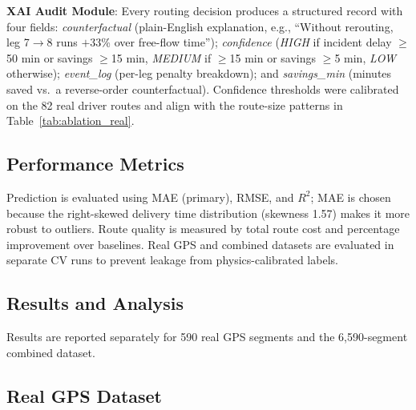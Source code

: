 \documentclass[conference]{IEEEtran}
\newcommand{\mar}[1]{\textcolor{black!90!white}{#1}}
\begin{document}
\textbf{XAI Audit Module}: Every routing decision produces a structured record
with four fields: \textit{counterfactual} (plain-English explanation, e.g.,
``Without rerouting, leg 7$\to$8 runs $+$33\% over free-flow time'');
\textit{confidence} (\textit{HIGH} if incident delay $\geq$50 min or savings
$\geq$15 min, \textit{MEDIUM} if $\geq$15 min or savings $\geq$5 min,
\textit{LOW} otherwise); \textit{event\_log} (per-leg penalty breakdown); and
\textit{savings\_min} (minutes saved vs.\ a reverse-order counterfactual).
Confidence thresholds were calibrated on the 82 real driver routes and align
with the route-size patterns in Table~\ref{tab:ablation_real}.

\mar{\subsection{Performance Metrics}}

Prediction is evaluated using MAE (primary), RMSE, and $R^2$; MAE is chosen
because the right-skewed delivery time distribution (skewness 1.57) makes it
more robust to outliers. Route quality is measured by total route cost and
percentage improvement over baselines. Real GPS and combined datasets are
evaluated in separate CV runs to prevent leakage from physics-calibrated labels.

\mar{\section{\textbf{\large Results and Analysis}}}
\label{sec:results}

Results are reported separately for 590 real GPS segments and the 6,590-segment
combined dataset.

\subsection{Real GPS Dataset}

\begin{table}[H]
\centering
\caption{CV Results — Real GPS Segments (590 segments, 5-fold)}
\label{tab:real_cv}
\end{table}
\end{document}
